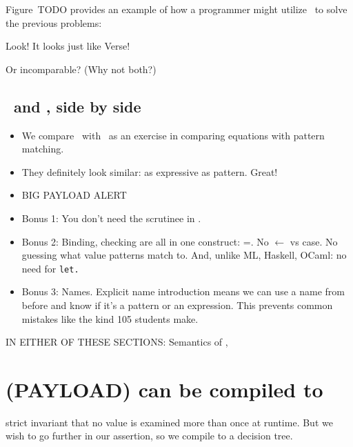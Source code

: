 \documentclass[manuscript,screen,review, 12pt]{acmart}
\begin{document}
    Figure~TODO provides an example of how a programmer might utilize
    \VMinus\ to solve the previous problems:

    
    
    
    
    Look! It looks just like Verse! 
   
    
        Or incomparable? (Why not both?)
    
    \subsection{\VMinus\ and \PPlus, side by side}

    \begin{itemize}
        \item We compare \VMinus\ with \PPlus\ as an exercise in comparing
        equations with pattern matching. 
        \item They definitely look similar: as expressive as pattern. Great! 
        \item{BIG PAYLOAD ALERT}
        \item Bonus 1: You don't need the scrutinee in \VMinus. 
        \item Bonus 2: Binding, checking are all in one construct: =. No
                $\leftarrow$ vs case. No guessing what value patterns match to. 
                And, unlike ML, Haskell, OCaml: no need for \tt{let}.
        \item Bonus 3: Names. Explicit name introduction means we can use a name
        from before and know if it's a pattern or an expression. This prevents
        common mistakes like the kind 105 students make. 
    \end{itemize}
    

    

    

    

IN EITHER OF THESE SECTIONS: Semantics of \PPlus, \VMinus

\section{(PAYLOAD) {\VMinus} can be compiled to }

    
    strict invariant that no value is examined more than once at runtime. But we wish to go further in our assertion, 
    so we compile \VMinus to a decision tree. 
    
    
    
\end{document}
